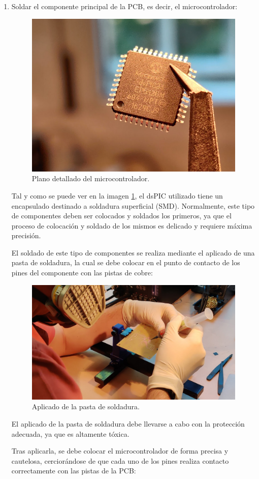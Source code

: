 \begin{enumerate}
    \item Soldar el componente principal de la \ac{PCB}, es decir, el microcontrolador:
    
    \begin{figure}[H]
    \centering 
    \includegraphics[width=0.5\linewidth]{pictures/DSPIC.jpg}
    \caption{Plano detallado del microcontrolador.}
    \label{fig:Micro_Detalle}
    \end{figure}
    
    Tal y como se puede ver en la imagen \ref{fig:Micro_Detalle}, el dsPIC utilizado tiene un encapsulado destinado a soldadura superficial (\ac{SMD}). Normalmente, este tipo de componentes deben ser colocados y soldados los primeros, ya que el proceso de colocación y soldado de los mismos es delicado y requiere máxima precisión.
    
    El soldado de este tipo de componentes se realiza mediante el aplicado de una pasta de soldadura, la cual se debe colocar en el punto de contacto de los pines del componente con las pistas de cobre:
    
    \begin{figure}[H]
    \centering 
    \includegraphics[width=0.65\linewidth]{pictures/SMD2.jpg}
    \caption{Aplicado de la pasta de soldadura.}
    \end{figure}
    
    El aplicado de la pasta de soldadura debe llevarse a cabo con la protección adecuada, ya que es altamente tóxica.
    
    Tras aplicarla, se debe colocar el microcontrolador de forma precisa y cautelosa, cerciorándose de que cada uno de los pines realiza contacto correctamente con las pistas de la \ac{PCB}:
    

\end{enumerate}
